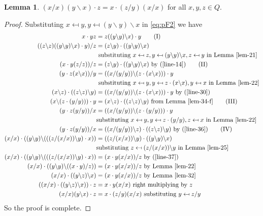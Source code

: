 \documentclass[12pt]{report}
\theoremstyle{definition}
\newtheorem{lem}[thm]{Lemma}
\newcommand{\ldv}{\backslash}       %
\newcommand{\rdv}{/}                %
\begin{document}
\begin{lem}\label{iso-lem}
  $(x\rdv x)(y\ldv x)\cdot z = x\cdot (z\rdv y)(x\rdv x)$ for all $x, y, z\in Q$.
\end{lem}

\begin{proof}
  Substituting $x\mapsfrom y, y\mapsfrom (y\ldv y)\ldv x$ in \ref{eq:pF2} we have
  \begin{align*}
    x\cdot yz &= z((y\ldv y)\ldv x)\cdot y\label{line-14} \tag{I}\\
    ((z\ldv z)((y\ldv y)\ldv x)\cdot y)\rdv z &= (z\ldv y)\cdot ((y\ldv y)\ldv x)\\
      &\text{ substituting $x\mapsfrom z,
      y\mapsfrom (y\ldv y)\ldv x, z\mapsfrom y$ in Lemma \ref{lem-21}}\\
    (x\cdot y(z\rdv z))\rdv z &= (z\ldv y)\cdot ((y\ldv y)\ldv x)\text{ by (\ref{line-14})}
      \label{line-30} \tag{II}\\
    (y\cdot z(x\ldv x))\rdv y &= ((x\rdv(y\rdv y))\ldv (z\cdot (x\ldv x)))\cdot y\\
      &\text{ substituting $x\mapsfrom y,
      y\mapsfrom z\cdot (x\ldv x), y\mapsfrom x$ in Lemma \ref{lem-22}}\\
    (x\ldv z)\cdot ((z\ldv z)\ldv y) &= ((x\rdv(y\rdv y))\ldv (z\cdot (x\ldv x)))\cdot y\text{ by (\ref{line-30})}\\
    (x\ldv(z\cdot (y\rdv y)))\cdot y &= (x\ldv z)\cdot ((z\ldv z)\ldv y)\text{ from Lemma \ref{lem-34-f}}
      \label{line-36} \tag{III}\\
    (y\cdot z(y\rdv y))\rdv x &= ((x\rdv (y\rdv y))\ldv (z\cdot (y\rdv y)))\cdot y\\
      &\text{substituting $x\mapsfrom y, y\mapsfrom z\cdot(y\rdv y), z\mapsfrom x$ in Lemma \ref{lem-22}}\\
    (y\cdot z(y\rdv y))\rdv x &= ((x\rdv(y\rdv y))\ldv z)\cdot ((z\ldv z)\ldv y)\text{ by (\ref{line-36})}
      \label{line-37} \tag{IV}\\
    (x\rdv x)\cdot ((y\ldv y)\ldv(((z\rdv (x\rdv x))\ldv y)\cdot x)) &= ((z\rdv (x\rdv x))\ldv y)\cdot ((y\ldv y)\ldv x)\\
      &\text{substituting $z\mapsfrom (z\rdv(x\rdv x))\ldv y$ in Lemma \ref{lem-25}}\\
    (x\rdv x)\cdot ((y\ldv y)\ldv(((z\rdv (x\rdv x))\ldv y)\cdot x)) &= (x\cdot y(x\rdv x))\rdv z\text{ by (\ref{line-37})}\\
    (x\rdv x)\cdot ((y\ldv y)\ldv ((x\cdot y)\rdv z)) &= (x\cdot y(x\rdv x))\rdv z\text{ by Lemma \ref{lem-22}}\\
    (x\rdv x)\cdot ((y\ldv z)\ldv x) &= (x\cdot y(x\rdv x))\rdv z\text{ by Lemma \ref{lem-32}}\\
    ((x\rdv x)\cdot ((y\ldv z)\ldv x))\cdot z &= x\cdot y(x\rdv x)\text{ right multiplying by $z$}\\
    (x\rdv x)(y\ldv x)\cdot z &= x\cdot (z\rdv y)(x\rdv x)\text{ substituting $y\mapsfrom z\rdv y$}
  \end{align*}
  So the proof is complete.
\end{proof}
\end{document}
